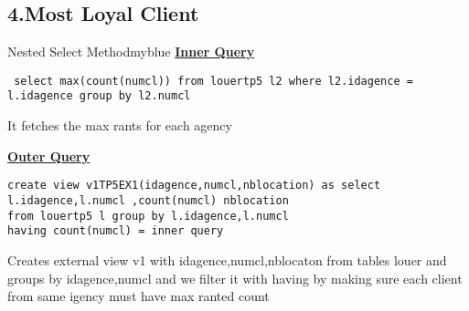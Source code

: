 \subsection*{4.Most Loyal Client}


\begin{prettyBox}{Nested Select Method}{myblue}
\textbf{\underline{Inner Query}}
\begin{lstlisting}
 select max(count(numcl)) from louertp5 l2 where l2.idagence = l.idagence group by l2.numcl
\end{lstlisting}
It fetches the max rants for each agency

\vspace{0.25cm}
\textbf{\underline{Outer Query}}
\begin{lstlisting}
create view v1TP5EX1(idagence,numcl,nblocation) as select l.idagence,l.numcl ,count(numcl) nblocation 
from louertp5 l group by l.idagence,l.numcl
having count(numcl) = inner query 
\end{lstlisting}
Creates external view v1 with idagence,numcl,nblocaton from tables louer and groups by idagence,numcl
and we filter it with having by making sure each client from same igency must have max ranted count
\end{prettyBox}
